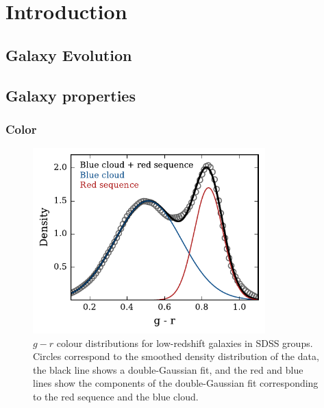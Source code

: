 \chapter{Introduction}
\label{chap:intro}

\section{Galaxy Evolution}
\label{sec:gal_evolution}

\section{Galaxy properties}
\label{sec:gal_properties}

\subsection{Color}
\label{sec:color}

\begin{figure}[!ht]
  \centering
  \includegraphics[width=0.8\textwidth]{gr_dist.pdf}
  \caption{$g-r$ colour distributions for low-redshift galaxies in
    SDSS groups.  Circles correspond to the smoothed density
    distribution of the data, the black line shows a double-Gaussian
    fit, and the red and blue lines show the components of the
    double-Gaussian fit corresponding to the red sequence and the blue
  cloud.}
  \label{fig:gr_dist}
\end{figure}

